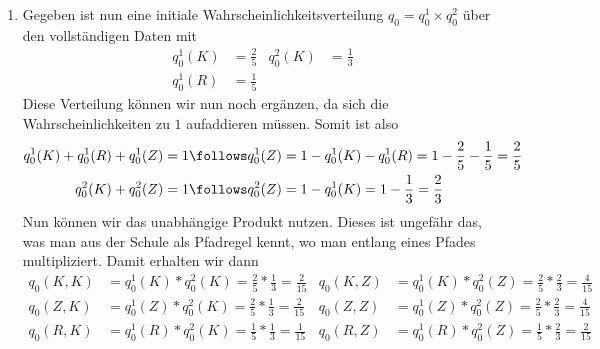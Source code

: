 \documentclass[ngerman, a4paper, 12pt]{article}
\begin{document}
\begin{enumerate}[label=(\alph*), leftmargin=0pt]
	\item 
	Gegeben ist nun eine initiale Wahrscheinlichkeitsverteilung $q_0 = q_0^1 \times q_0^2$ über den vollständigen Daten mit
	\begin{align*}
		q_0^1(K) &= \frac{2}{5} & q_0^2(K) &= \frac{1}{3} \\
		q_0^1(R) &= \frac{1}{5} 
	\end{align*}
	Diese Verteilung können wir nun noch ergänzen, da sich die Wahrscheinlichkeiten zu $1$ aufaddieren müssen. Somit ist also
	\begin{equation*} 
		\begin{aligned}
			q_0^1(K) + q_0^1(R) + q_0^1(Z) = 1 &\follows q_0^1(Z) = 1 - q_0^1(K) - q_0^1(R) = 1 - \frac{2}{5} - \frac{1}{5} = \frac{2}{5} \\
			q_0^2(K) + q_0^2(Z) = 1 &\follows q_0^2(Z) = 1 - q_0^1(K) = 1 - \frac{1}{3} = \frac{2}{3}
		\end{aligned}
	\end{equation*}
	Nun können wir das unabhängige Produkt nutzen. Dieses ist ungefähr das, was man aus der Schule als Pfadregel kennt, wo man entlang eines Pfades multipliziert.
	Damit erhalten wir dann
	\begin{align*}
		q_0(K,K) &= q_0^1(K) * q_0^2(K) = \frac{2}{5} * \frac{1}{3} = \frac{2}{15} 
		& q_0(K,Z) &= q_0^1(K) * q_0^2(Z) = \frac{2}{5} * \frac{2}{3} = \frac{4}{15} \\
		q_0(Z,K) &= q_0^1(Z) * q_0^2(K) = \frac{2}{5} * \frac{1}{3} = \frac{2}{15}
		& q_0(Z,Z) &= q_0^1(Z) * q_0^2(Z) = \frac{2}{5} * \frac{2}{3} = \frac{4}{15} \\
		q_0(R,K) &= q_0^1(R) * q_0^2(K) = \frac{1}{5} * \frac{1}{3} = \frac{1}{15}
		& q_0(R,Z) &= q_0^1(R) * q_0^2(Z) = \frac{1}{5} * \frac{2}{3} = \frac{2}{15}
	\end{align*}
	

\end{enumerate}
\end{document}
